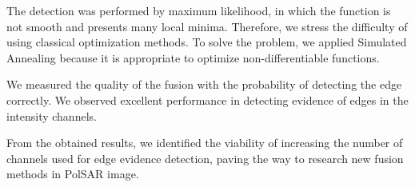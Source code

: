 \documentclass[conference]{IEEEtran}
\begin{document}
The detection was performed by maximum likelihood, in which the function is not smooth and presents many local minima.
Therefore, we stress the difficulty of using classical optimization methods. 
To solve the problem, we applied Simulated Annealing because it is appropriate to optimize non-differentiable functions.

We measured the quality of the fusion with the probability of detecting the edge correctly.
We observed excellent performance in detecting evidence of edges in the intensity channels.

From the obtained results, we identified the viability of increasing the number of channels used for edge evidence detection, paving the way to research new fusion methods in PolSAR image.



\end{document}
